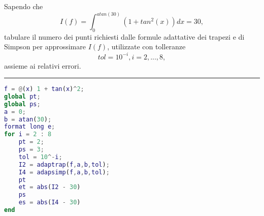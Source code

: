 Sapendo che $$I(f) = \int_{0}^{atan(30)} (1+tan^{2}(x))dx = 30, $$ tabulare il numero dei punti richiesti dalle formule adattative dei trapezi e di Simpson per approssimare $I(f)$, utilizzate con tolleranze $$ tol = 10^{-i}, i = 2,...,8,$$ assieme ai relativi errori.

\hspace*{\fill}
\par\noindent\rule{\textwidth}{0.4pt}
\hspace*{\fill}

\begin{lstlisting}[language=Matlab, caption=Codice Matlab]
f = @(x) 1 + tan(x)^2;
global pt;
global ps;
a = 0;
b = atan(30);
format long e;
for i = 2 : 8
    pt = 2;
    ps = 3;
    tol = 10^-i;
    I2 = adaptrap(f,a,b,tol);
    I4 = adapsimp(f,a,b,tol);
    pt
    et = abs(I2 - 30)
    ps
    es = abs(I4 - 30)
end
\end{lstlisting}

\begin{table}[H]
    \caption{Risultati}
    \centering
\end{table}
